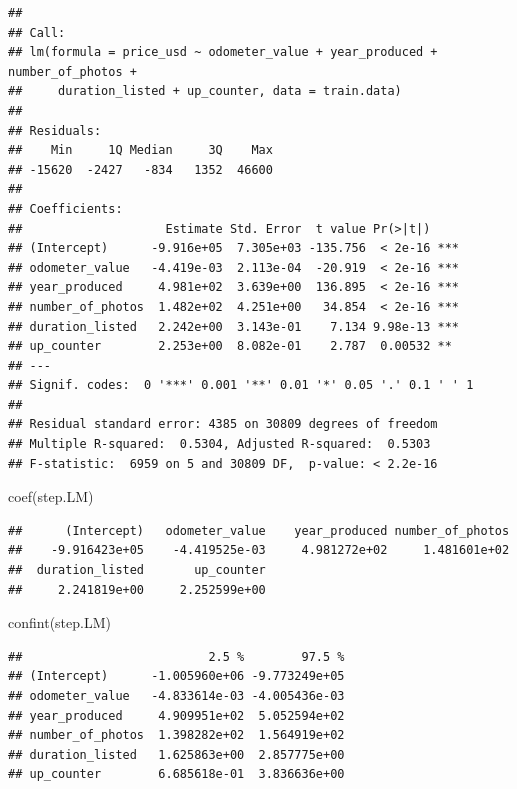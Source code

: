\documentclass[
]{article}
\newenvironment{Shaded}{\begin{snugshade}}{\end{snugshade}}
\newcommand{\FunctionTok}[1]{\textcolor[rgb]{0.00,0.00,0.00}{#1}}
\newcommand{\NormalTok}[1]{#1}
\begin{document}
\begin{verbatim}
## 
## Call:
## lm(formula = price_usd ~ odometer_value + year_produced + number_of_photos + 
##     duration_listed + up_counter, data = train.data)
## 
## Residuals:
##    Min     1Q Median     3Q    Max 
## -15620  -2427   -834   1352  46600 
## 
## Coefficients:
##                    Estimate Std. Error  t value Pr(>|t|)    
## (Intercept)      -9.916e+05  7.305e+03 -135.756  < 2e-16 ***
## odometer_value   -4.419e-03  2.113e-04  -20.919  < 2e-16 ***
## year_produced     4.981e+02  3.639e+00  136.895  < 2e-16 ***
## number_of_photos  1.482e+02  4.251e+00   34.854  < 2e-16 ***
## duration_listed   2.242e+00  3.143e-01    7.134 9.98e-13 ***
## up_counter        2.253e+00  8.082e-01    2.787  0.00532 ** 
## ---
## Signif. codes:  0 '***' 0.001 '**' 0.01 '*' 0.05 '.' 0.1 ' ' 1
## 
## Residual standard error: 4385 on 30809 degrees of freedom
## Multiple R-squared:  0.5304, Adjusted R-squared:  0.5303 
## F-statistic:  6959 on 5 and 30809 DF,  p-value: < 2.2e-16
\end{verbatim}

\begin{Shaded}
\begin{Highlighting}[]
\FunctionTok{coef}\NormalTok{(step.LM)}
\end{Highlighting}
\end{Shaded}

\begin{verbatim}
##      (Intercept)   odometer_value    year_produced number_of_photos 
##    -9.916423e+05    -4.419525e-03     4.981272e+02     1.481601e+02 
##  duration_listed       up_counter 
##     2.241819e+00     2.252599e+00
\end{verbatim}

\begin{Shaded}
\begin{Highlighting}[]
\FunctionTok{confint}\NormalTok{(step.LM)}
\end{Highlighting}
\end{Shaded}

\begin{verbatim}
##                          2.5 %        97.5 %
## (Intercept)      -1.005960e+06 -9.773249e+05
## odometer_value   -4.833614e-03 -4.005436e-03
## year_produced     4.909951e+02  5.052594e+02
## number_of_photos  1.398282e+02  1.564919e+02
## duration_listed   1.625863e+00  2.857775e+00
## up_counter        6.685618e-01  3.836636e+00
\end{verbatim}
\end{document}
